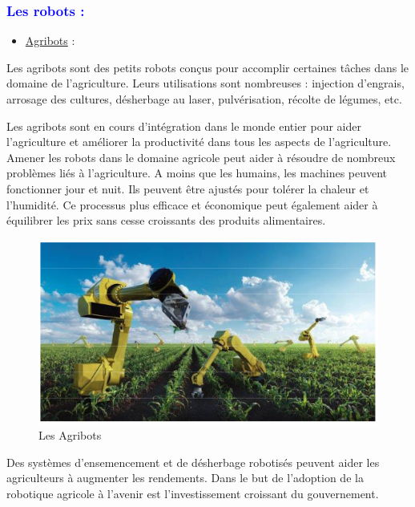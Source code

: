 \begin{flushleft}
	\subsubsection{\textcolor{blue}{Les robots :}}
		\begin{itemize}
			\item \underline{Agribots} :
		\end{itemize}
	Les agribots sont des petits robots conçus pour accomplir certaines tâches dans le domaine de l’agriculture. Leurs utilisations sont nombreuses : injection d’engrais, arrosage des cultures, désherbage au laser, pulvérisation, récolte de
	légumes, etc.
	 
	Les agribots sont en cours d'intégration dans le monde entier pour aider l'agriculture et améliorer la productivité dans tous les aspects de l'agriculture. Amener les robots dans le domaine agricole peut aider à résoudre de nombreux
	problèmes liés à l'agriculture. A moins que les humains, les machines peuvent fonctionner jour et nuit. Ils peuvent être ajustés pour tolérer la chaleur et l'humidité. Ce processus plus efficace et économique peut également aider à équilibrer les prix sans cesse croissants des produits alimentaires.
	\begin{figure}[h]
		\centering
		\includegraphics{chapitres/images/Agribots.PNG}
		\caption{Les Agribots}
		\label{fig:labelname}
	\end{figure}
	
	Des systèmes d'ensemencement et de désherbage robotisés peuvent aider les agriculteurs à augmenter les rendements. Dans le but de l'adoption de la robotique agricole à l'avenir est l'investissement croissant du gouvernement.
	

\end{flushleft}
